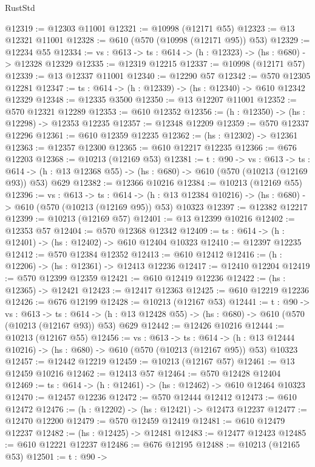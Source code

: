 \begin{lexlean}{RustStd}
\begin{coremodule}
@12319 := @12303 @11001
@12321 := @10998 (@12171 @55)
@12323 := @13 @12321 @11001
@12328 := @610 (@570 (@10998 (@12171 @95)) @53)
@12329 := @12234 @55
@12334 := {vs : @613} -> {ts : @614} -> (h : @12323) -> (hs : @680) -> @12328 @12329
@12335 := @12319 @12215
@12337 := @10998 (@12171 @57)
@12339 := @13 @12337 @11001
@12340 := @12290 @57
@12342 := @570 @12305 @12281
@12347 := {ts : @614} -> (h : @12339) -> (hs : @12340) -> @610 @12342 @12329
@12348 := @12335 @3500
@12350 := @13 @12207 @11001
@12352 := @570 @12321 @12289
@12353 := @610 @12352
@12356 := (h : @12350) -> (hs : @12298) -> @12353 @12235
@12357 := @12348 @12209
@12359 := @570 @12337 @12296
@12361 := @610 @12359 @12235
@12362 := (hs : @12302) -> @12361
@12363 := @12357 @12300
@12365 := @610 @12217 @12235
@12366 := @676 @12203
@12368 := @10213 (@12169 @53)
@12381 := {t : @90} ->
  {vs : @613} ->
  {ts : @614} -> (h : @13 @12368 @55) -> (hs : @680) -> @610 (@570 (@10213 (@12169 @93)) @53) @629
@12382 := @12366 @10216
@12384 := @10213 (@12169 @55)
@12396 := {vs : @613} ->
  {ts : @614} ->
  (h : @13 @12384 @10216) -> (hs : @680) -> @610 (@570 (@10213 (@12169 @95)) @53) @10323
@12397 := @12382 @12217
@12399 := @10213 (@12169 @57)
@12401 := @13 @12399 @10216
@12402 := @12353 @57
@12404 := @570 @12368 @12342
@12409 := {ts : @614} -> (h : @12401) -> (hs : @12402) -> @610 @12404 @10323
@12410 := @12397 @12235
@12412 := @570 @12384 @12352
@12413 := @610 @12412
@12416 := (h : @12206) -> (hs : @12361) -> @12413 @12236
@12417 := @12410 @12204
@12419 := @570 @12399 @12359
@12421 := @610 @12419 @12236
@12422 := (hs : @12365) -> @12421
@12423 := @12417 @12363
@12425 := @610 @12219 @12236
@12426 := @676 @12199
@12428 := @10213 (@12167 @53)
@12441 := {t : @90} ->
  {vs : @613} ->
  {ts : @614} -> (h : @13 @12428 @55) -> (hs : @680) -> @610 (@570 (@10213 (@12167 @93)) @53) @629
@12442 := @12426 @10216
@12444 := @10213 (@12167 @55)
@12456 := {vs : @613} ->
  {ts : @614} ->
  (h : @13 @12444 @10216) -> (hs : @680) -> @610 (@570 (@10213 (@12167 @95)) @53) @10323
@12457 := @12442 @12219
@12459 := @10213 (@12167 @57)
@12461 := @13 @12459 @10216
@12462 := @12413 @57
@12464 := @570 @12428 @12404
@12469 := {ts : @614} -> (h : @12461) -> (hs : @12462) -> @610 @12464 @10323
@12470 := @12457 @12236
@12472 := @570 @12444 @12412
@12473 := @610 @12472
@12476 := (h : @12202) -> (hs : @12421) -> @12473 @12237
@12477 := @12470 @12200
@12479 := @570 @12459 @12419
@12481 := @610 @12479 @12237
@12482 := (hs : @12425) -> @12481
@12483 := @12477 @12423
@12485 := @610 @12221 @12237
@12486 := @676 @12195
@12488 := @10213 (@12165 @53)
@12501 := {t : @90} ->

\end{coremodule}
\end{lexlean}
